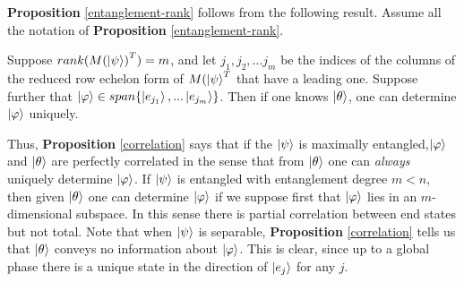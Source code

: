 {\bf{Proposition}} \ref{entanglement-rank} follows from the following result.  Assume all the notation of {\bf{Proposition}} \ref{entanglement-rank}.
\begin{prop}
\label{correlation}
Suppose $rank({M(\ket{\psi})}^T)=m$, and let $j_1, j_2, ... j_m$ be the indices of the columns of the reduced row echelon form of $M(\ket{\psi}^T$ that have a leading one.  Suppose further that $\ket{\varphi} \in span\{\ket{e_{j_1}}, ... \ket{e_{j_m}}\}$.  Then if one knows $\ket{\theta}$, one can determine $\ket{\varphi}$ uniquely.  
\end{prop}
Thus, {\bf{Proposition}} \ref{correlation} says that if the $\ket{\psi}$ is maximally entangled,$\ket{\varphi}$ and $\ket{\theta}$ are perfectly correlated in the sense that from $\ket{\theta}$ one can {\emph{always}} uniquely determine $\ket{\varphi}$.  If $\ket{\psi}$ is entangled with entanglement degree $m<n$, then given $\ket{\theta}$ one can determine $\ket{\varphi}$ if we suppose first that $\ket{\varphi}$ lies in an $m$-dimensional subspace.  In this sense there is partial correlation between end states but not total.  Note that when $\ket{\psi}$ is separable, {\bf{Proposition}} \ref{correlation} tells us that $\ket{\theta}$ conveys no information about $\ket{\varphi}$.  This is clear, since up to a global phase there is a unique state in the direction of $\ket{e_j}$ for any $j$.


